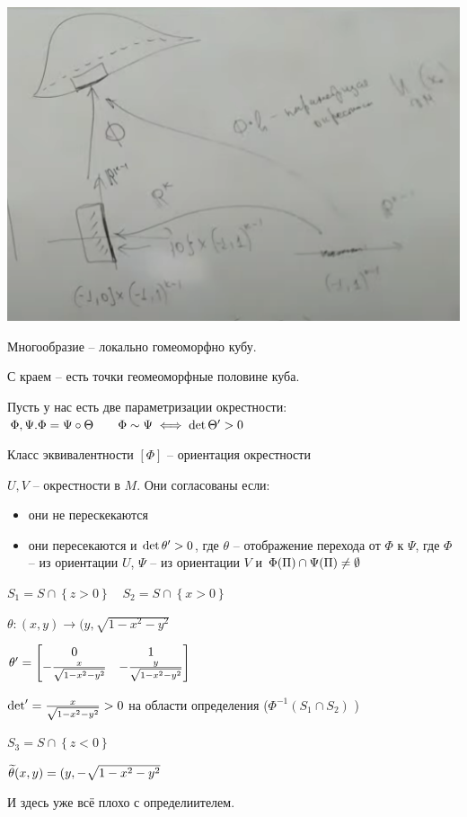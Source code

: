 \begin{center}
    \includegraphics[scale=0.4]{img/extreme-points-of-extreme-points-ex1}
\end{center}

\begin{note}[Воспоминания]
    Многообразие -- локально гомеоморфно кубу.

    С краем -- есть точки геомеоморфные половине куба.

    Пусть у нас есть две параметризации окрестности: $\Phi, \Psi. \Phi = \Psi \circ \Theta\qquad \Phi \sim \Psi \iff \det \Theta^{\prime} > 0$

    Класс эквивалентности $\left[ \Phi \right] $ -- ориентация окрестности

    $U, V$ -- окрестности в  $M$. Они согласованы если:
     \begin{itemize}
        \item они не перескекаются
        \item они пересекаются и $\det \theta^{\prime} > 0$, где $\theta$ -- отображение перехода от  $\Phi$ к  $\Psi$, где  $\Phi$ -- из ориентации  $U$,  $\Psi$ -- из ориентации  $V$ и  $\Phi(\Pi) \cap \Psi(\Pi) \neq \emptyset $        
    \end{itemize}
\end{note}

\begin{example}
    $S_1 = S \cap \left\{ z>0 \right\} \quad S_2 = S \cap  \left\{ x>0 \right\} $

    $\theta: (x,y) \to (y, \sqrt{1 - x^2-y^2} $ 

    $\theta^{\prime} = \begin{bmatrix} 0&1\\ -\frac{x}{\sqrt{1-x^2-y^2} }& -\frac{y}{\sqrt{1 - x^2-y^2} } \end{bmatrix} $

    $\det^{\prime} = \frac{x}{\sqrt{1 - x^2-y^2} }>0$ на области определения ($\Phi^{-1}(S_1\cap S_2)$ )

    $S_3 = S \cap \left\{ z<0 \right\} \quad $

    $\widetilde{\theta}(x,y) = (y, -\sqrt{1-x^2-y^2} $ 

    И здесь уже всё плохо с определиителем.
\end{example}

